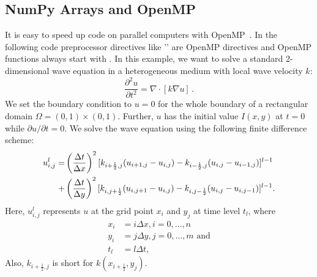 \subsection{NumPy Arrays and OpenMP}
It is easy to speed up code on parallel computers with OpenMP~\cite{www:openmP}. In 
the following code preprocessor directives like '' are OpenMP directives and
OpenMP functions always start with .
In this example, we want
to solve a standard 2-dimensional wave equation in a heterogeneous medium with
local wave velocity $k$:
\begin{equation}
\frac{\partial^2u}{\partial t^2} = \nabla \cdot [k\nabla u]\, .
\end{equation}
We set the boundary condition to $u = 0$ for the whole boundary of a
rectangular domain $\Omega = (0,1) \times (0,1)$. Further, $u$ has the initial
value $I(x,y)$ at $t = 0$ while $\partial u/ \partial t = 0$.
We solve the wave equation using the following finite difference scheme:
\begin{align}
u_{i,j}^l =
&\left(\frac{\Delta t}{\Delta x}\right)^2
[k_{i+\frac{1}{2},j}(u_{i+1,j} - u_{i,j}) - k_{i-\frac{1}{2},j}(u_{i,j} - u_{i-1,j})]^{l-1}\notag\\
+&\left(\frac{\Delta t}{\Delta y}\right)^2
[k_{i,j+\frac{1}{2}}(u_{i,j+1} - u_{i,j}) - k_{i,j-\frac{1}{2}}(u_{i,j} - u_{i,j-1})]^{l-1}.
\end{align}\label{u}
Here, $u_{i,j}^l$ represents $u$ at the grid point $x_i$ and $y_j$ at
time level $t_l$, where
\begin{align*}
x_i &= i\Delta x, i = 0, \ldots, n\\
y_i &= j\Delta y, j = 0, \ldots, m\textrm{ and}\\
t_l &= l\Delta t,
\end{align*}
Also, $k_{i+\frac{1}{2},j}$ is short for $k(x_{i+\frac{1}{2}},y_j)$.

